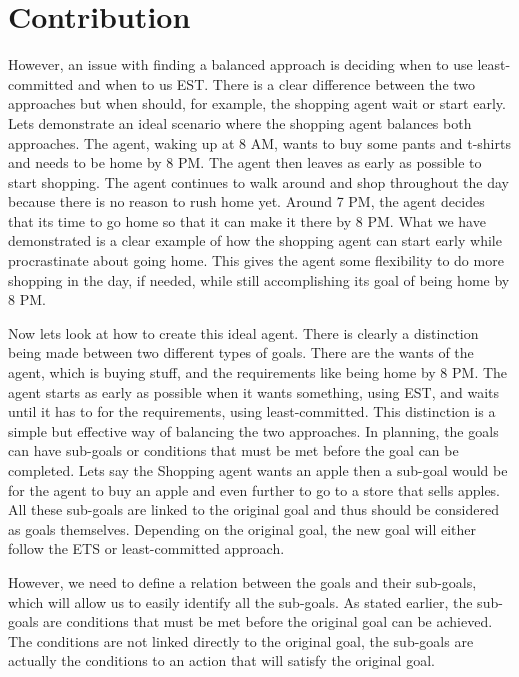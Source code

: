 \section{Contribution}

However, an issue with finding a balanced approach is deciding when to
use least-committed and when to us EST. There is a clear difference
between the two approaches but when should, for example, the shopping
agent wait or start early. Lets demonstrate an ideal scenario where
the shopping agent balances both approaches. The agent, waking up at 8
AM, wants to buy some pants and t-shirts and needs to be home by 8
PM. The agent then leaves as early as possible to start shopping. The
agent continues to walk around and shop throughout the day because
there is no reason to rush home yet. Around 7 PM, the agent decides
that its time to go home so that it can make it there by 8 PM. What we
have demonstrated is a clear example of how the shopping agent can
start early while procrastinate about going home. This gives the agent
some flexibility to do more shopping in the day, if needed, while
still accomplishing its goal of being home by 8 PM.

Now lets look at how to create this ideal agent. There is clearly a
distinction being made between two different types of goals. There are
the wants of the agent, which is buying stuff, and the requirements
like being home by 8 PM.  The agent starts as early as possible when
it wants something, using EST, and waits until it has to for the
requirements, using least-committed. This distinction is a simple but
effective way of balancing the two approaches. In planning, the goals
can have sub-goals or conditions that must be met before the goal can
be completed. Lets say the Shopping agent wants an apple then a
sub-goal would be for the agent to buy an apple and even further to go
to a store that sells apples. All these sub-goals are linked to the
original goal and thus should be considered as goals
themselves. Depending on the original goal, the new goal will either
follow the ETS or least-committed approach.

However, we need to define a relation between the goals and their
sub-goals, which will allow us to easily identify all the
sub-goals. As stated earlier, the sub-goals are conditions that must
be met before the original goal can be achieved. The conditions are
not linked directly to the original goal, the sub-goals are actually
the conditions to an action that will satisfy the original goal.
